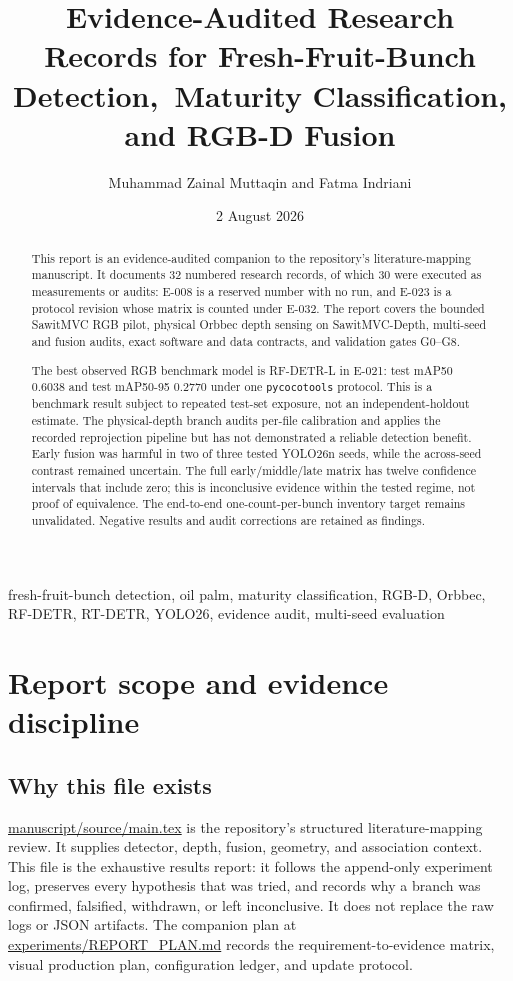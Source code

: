 \documentclass[preprint,12pt]{elsarticle}
\title{Evidence-Audited Research Records for Fresh-Fruit-Bunch Detection,\
Maturity Classification, and RGB-D Fusion}
\author{Muhammad Zainal Muttaqin and Fatma Indriani}
\date{2 August 2026}
\newcommand{\pathcode}[1]{\scriptsize\url{#1}}
\newcommand{\E}[1]{E-#1}
\newcommand{\G}[1]{G#1}
\newcommand{\mAP}{mAP}
\begin{document}
\begin{frontmatter}
\maketitle
\begin{abstract}
This report is an evidence-audited companion to the repository's
literature-mapping manuscript. It documents 32 numbered research records,
of which 30 were executed as measurements or audits: E-008 is a reserved
number with no run, and E-023 is a protocol revision whose matrix is counted
under E-032. The report covers the bounded SawitMVC RGB pilot, physical Orbbec
depth sensing on SawitMVC-Depth, multi-seed and fusion audits, exact software
and data contracts, and validation gates \G{0}--\G{8}.

The best observed RGB benchmark model is RF-DETR-L in \E{021}: test \mAP50{}
\(0.6038\) and test \mAP50-95 \(0.2770\) under one \texttt{pycocotools}
protocol. This is a benchmark result subject to repeated test-set exposure,
not an independent-holdout estimate. The physical-depth branch audits
per-file calibration and applies the recorded reprojection pipeline but has not demonstrated a
reliable detection benefit. Early fusion was harmful in two of three tested
YOLO26n seeds, while the across-seed contrast remained uncertain. The full
early/middle/late matrix has twelve confidence intervals that include zero;
this is inconclusive evidence within the tested regime, not proof of
equivalence. The end-to-end one-count-per-bunch inventory target remains
unvalidated. Negative results and audit corrections are retained as findings.
\end{abstract}
\begin{keyword}
fresh-fruit-bunch detection, oil palm, maturity classification, RGB-D,
Orbbec, RF-DETR, RT-DETR, YOLO26, evidence audit, multi-seed evaluation
\end{keyword}
\end{frontmatter}

\section{Report scope and evidence discipline}
\label{sec:scope}
\subsection{Why this file exists}
\pathcode{manuscript/source/main.tex} is the repository's structured
literature-mapping review. It supplies detector, depth, fusion, geometry, and
association context. This file is the exhaustive results report: it follows
the append-only experiment log, preserves every hypothesis that was tried,
and records why a branch was confirmed, falsified, withdrawn, or left
inconclusive. It does not replace the raw logs or JSON artifacts.
The companion plan at
\pathcode{experiments/REPORT_PLAN.md} records the requirement-to-evidence
matrix, visual production plan, configuration ledger, and update protocol.
\end{document}
